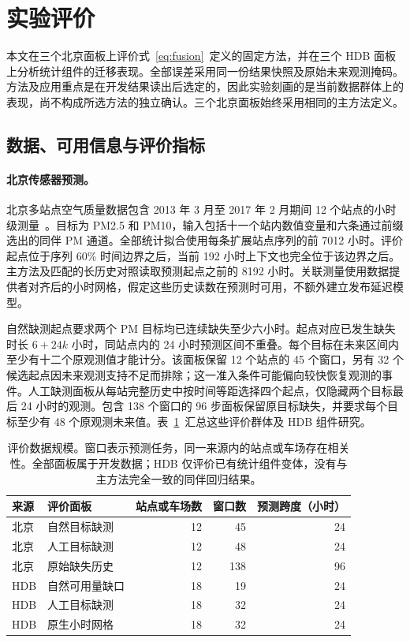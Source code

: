 \section{实验评价}
\label{sec:experiments}

本文在三个北京面板上评价式~\eqref{eq:fusion}~定义的固定方法，并在三个 HDB 面板上分析统计组件的迁移表现。全部误差采用同一份结果快照及原始未来观测掩码。方法及应用重点是在开发结果读出后选定的，因此实验刻画的是当前数据群体上的表现，尚不构成所选方法的独立确认。三个北京面板始终采用相同的主方法定义。

\subsection{数据、可用信息与评价指标}

\paragraph{北京传感器预测。}
北京多站点空气质量数据包含 2013 年 3 月至 2017 年 2 月期间 12 个站点的小时级测量~\citep{uci2017beijing}。目标为 PM2.5 和 PM10，输入包括十一个站内数值变量和六条通过前缀选出的同伴 PM 通道。全部统计拟合使用每条扩展站点序列的前 7012 小时。评价起点位于序列 60\% 时间边界之后，当前 192 小时上下文也完全位于该边界之后。主方法及匹配的长历史对照读取预测起点之前的 8192 小时。关联测量使用数据提供者对齐后的小时网格，假定这些历史读数在预测时可用，不额外建立发布延迟模型。

自然缺测起点要求两个 PM 目标均已连续缺失至少六小时。起点对应已发生缺失时长 $6+24k$ 小时，同站点内的 24 小时预测区间不重叠。每个目标在未来区间内至少有十二个原观测值才能计分。该面板保留 12 个站点的 45 个窗口，另有 32 个候选起点因未来观测支持不足而排除；这一准入条件可能偏向较快恢复观测的事件。人工缺测面板从每站完整历史中按时间等距选择四个起点，仅隐藏两个目标最后 24 小时的观测。包含 138 个窗口的 96 步面板保留原目标缺失，并要求每个目标至少有 48 个原观测未来值。表~\ref{tab:data}~汇总这些评价群体及 HDB 组件研究。

\begin{table}[t]
\caption{评价数据规模。窗口表示预测任务，同一来源内的站点或车场存在相关性。全部面板属于开发数据；HDB 仅评价已有统计组件变体，没有与主方法完全一致的同伴回归结果。}
\label{tab:data}
\centering\small
\begin{tabular}{llrrr}
\toprule
来源 & 评价面板 & 站点或车场数 & 窗口数 & 预测跨度（小时）\\
\midrule
北京 & 自然目标缺测 & 12 & 45 & 24\\
北京 & 人工目标缺测 & 12 & 48 & 24\\
北京 & 原始缺失历史 & 12 & 138 & 96\\
HDB & 自然可用量缺口 & 18 & 19 & 24\\
HDB & 人工目标缺测 & 18 & 32 & 24\\
HDB & 原生小时网格 & 18 & 32 & 24\\
\bottomrule
\end{tabular}
\end{table}

